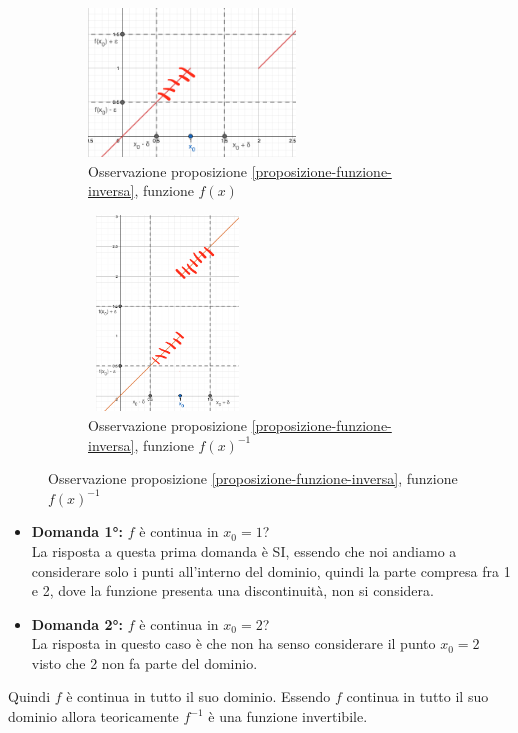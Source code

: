 \begin{figure}[h!]
    \vspace{10pt}
    \begin{subfigure}{.5\textwidth}
        \centering
        \includegraphics[width=5.5cm]{images/esempio1-osservazione-prop1.png}
        \caption{Osservazione proposizione \ref{proposizione-funzione-inversa}, funzione $f(x)$}
        \label{fig:es1-prop1}
    \end{subfigure}
    \begin{subfigure}{.5\textwidth}
        \centering
        \includegraphics[width=4.2cm, height=5.2cm]{images/esempio2-osservzione-prop1.png}
        \caption{Osservazione proposizione \ref{proposizione-funzione-inversa}, funzione $f(x)^{-1}$}
        \label{fig:es2-prop1}
    \end{subfigure}
\end{figure}
\begin{itemize}
    \item \textbf{Domanda 1°:} $f$ è continua in $x_0 = 1$?\\
    La risposta a questa prima domanda è SI, essendo che noi andiamo a considerare solo i punti all'interno del dominio, quindi la parte compresa fra 1 e 2, dove la funzione presenta una discontinuità, non si considera.
    \item \textbf{Domanda 2°:} $f$ è continua in $x_0 = 2$?\\
La risposta in questo caso è che non ha senso considerare il punto $x_0 = 2$ visto che 2 non fa parte del dominio.
\end{itemize}
Quindi $f$ è continua in tutto il suo dominio. Essendo $f$ continua in tutto il suo dominio allora teoricamente $f^{-1}$ è una funzione invertibile. \\ \\
